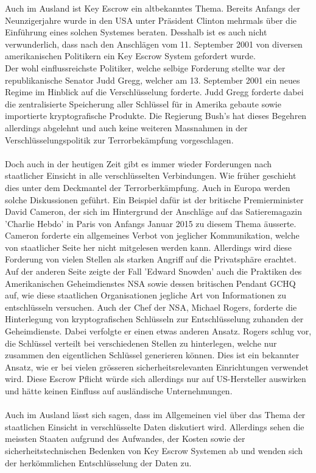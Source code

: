 Auch im Ausland ist Key Escrow ein altbekanntes Thema. Bereits Anfangs der Neunzigerjahre wurde in den USA unter Präsident Clinton mehrmals über die Einführung eines solchen Systemes beraten. \cite[S. 5735]{adminch} \cite{denning}
Desshalb ist es auch nicht verwunderlich, dass nach den Anschlägen vom 11. September 2001 von diversen amerikanischen Politikern ein Key Escrow System gefordert wurde. \\
Der wohl einflussreichste Politiker, welche selbige Forderung stellte war der republikanische Senator Judd Gregg, welcher am 13. September 2001 ein neues Regime im Hinblick auf die Verschlüsselung forderte. Judd Gregg forderte dabei die zentralisierte Speicherung aller Schlüssel für in Amerika gebaute sowie importierte kryptografische Produkte. Die Regierung Bush's hat dieses Begehren allerdings abgelehnt und auch keine weiteren Massnahmen in der Verschlüsselungspolitik zur Terrorbekämpfung vorgeschlagen. \cite{denning}\\ 
\\
Doch auch in der heutigen Zeit gibt es immer wieder Forderungen nach staatlicher Einsicht in alle verschlüsselten Verbindungen. Wie früher geschieht dies unter dem Deckmantel der Terrorberkämpfung. Auch in Europa werden solche Diskussionen geführt. Ein Beispiel dafür ist der britische Premierminister David Cameron, der sich im Hintergrund der Anschläge auf das Satieremagazin 'Charlie Hebdo' in Paris von Anfangs Januar 2015 zu diesem Thema äusserte. \\
Cameron forderte ein allgemeines Verbot von jeglicher Kommunikation, welche von staatlicher Seite her nicht mitgelesen werden kann. Allerdings wird diese Forderung von vielen Stellen als starken Angriff auf die Privatsphäre erachtet. \cite{insideit} \\
Auf der anderen Seite zeigte der Fall 'Edward Snowden' auch die Praktiken des Amerikanischen Geheimdienstes NSA sowie dessen britischen Pendant GCHQ auf, wie diese staatlichen Organisationen jegliche Art von Informationen zu entschlüsseln versuchen. Auch der Chef der NSA, Michael Rogers, forderte die Hinterlegung von kryptografischen Schlüsseln zur Entschlüsselung zuhanden der Geheimdienste. Dabei verfolgte er einen etwas anderen Ansatz. Rogers schlug vor, die Schlüssel verteilt bei verschiedenen Stellen zu hinterlegen, welche nur zusammen den eigentlichen Schlüssel generieren können. Dies ist ein bekannter Ansatz, wie er bei vielen grösseren sicherheitsrelevanten Einrichtungen verwendet wird. Diese Escrow Pflicht würde sich allerdings nur auf US-Hersteller auswirken und hätte keinen Einfluss auf ausländische Unternehmungen. \cite{annabiselli} \\
\\
Auch im Ausland lässt sich sagen, dass im Allgemeinen viel über das Thema der staatlichen Einsicht in verschlüsselte Daten diskutiert wird. Allerdings sehen die meissten Staaten aufgrund des Aufwandes, der Kosten sowie der sicherheitstechnischen Bedenken von Key Escrow Systemen ab und wenden sich der herkömmlichen Entschlüsselung der Daten zu.

